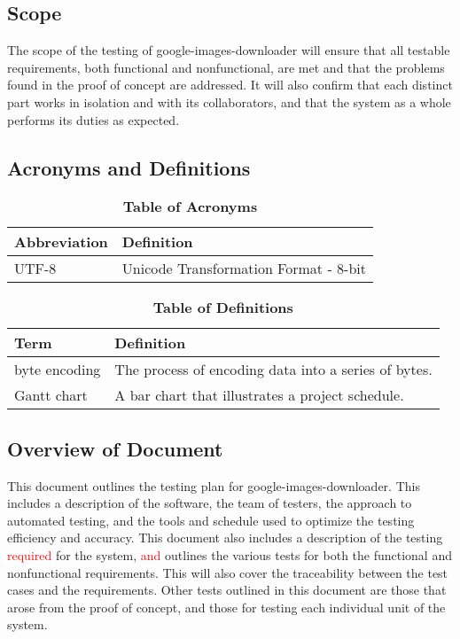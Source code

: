 \documentclass[12pt, titlepage]{article}
\begin{document}
\subsection{Scope}
The scope of the testing of google-images-downloader will ensure that all testable requirements, both functional and nonfunctional, are met and that the problems found in the proof of concept are addressed. It will also confirm that each distinct part works in isolation and with its collaborators, and that the system as a whole performs its duties as expected.

\subsection{Acronyms and Definitions}
	
\begin{table}[hbp]
\label{TableOfAbbr}

\begin{tabularx}{\textwidth}{p{3cm}X}
\toprule
\textbf{Abbreviation} & \textbf{Definition} \\
\midrule
UTF-8 & Unicode Transformation Format - 8-bit\\
\bottomrule
\end{tabularx}
\caption{\textbf{Table of Acronyms}} 

\end{table}

\begin{table}[!htbp]
\label{TableOfDef}

\begin{tabularx}{\textwidth}{p{3cm}X}
\toprule
\textbf{Term} & \textbf{Definition}\\
\midrule
byte encoding & The process of encoding data into a series of bytes.\\
Gantt chart & A bar chart that illustrates a project schedule.\\
\bottomrule
\end{tabularx}
\caption{\textbf{Table of Definitions}} 

\end{table}	

\subsection{Overview of Document}

This document outlines the testing plan for google-images-downloader. This includes a description of the software, 
the team of testers, the approach to automated testing, and the tools and schedule used to optimize the testing 
efficiency and accuracy. This document also includes a description of the testing \textcolor{red}{required} for the system, 
\textcolor{red}{and} outlines the various tests for both the functional and nonfunctional requirements. This will also cover the traceability 
between the test cases and the requirements. Other tests outlined in this document are those that arose from 
the proof of concept, and those for testing each individual unit of the system.
\end{document}
